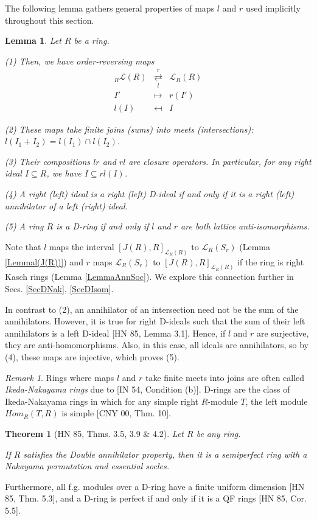 \documentclass[11pt]{article}
\theoremstyle{plain}
\newtheorem{Lemma}[veta]{Lemma}
\newtheorem{Thm}[veta]{Theorem}
\theoremstyle{remark}
\newtheorem*{remark}{Remark}
\theoremstyle{plain}
\begin{document}
The following lemma gathers general properties of maps $l$ and $r$ used implicitly throughout this section.
\begin{Lemma}\label{Lemmalr}
    Let $R$ be a ring. 

 (1)   Then, we have order-reversing maps
\[
\begin{array}{rcl}
_R\mathcal{L}(R) & \overset{r}{\underset{l}{\rightleftarrows}} & \mathcal{L}_R(R) \\
I' & \mapsto & r(I') \\
l(I) & \mapsfrom & I
\end{array}
\]

(2) These maps take finite joins (sums) into meets (intersections): $l(I_1+I_2)=l(I_1)\cap l(I_2)$.

(3) Their compositions $lr$ and $rl$ are closure operators. In particular, for any right ideal $I\subseteq R$, we have $I\subseteq rl(I)$.

(4) A right (left) ideal is a right (left) D-ideal if and only if it is a right (left) annihilator of a left (right) ideal.

(5) A ring $R$ is a D-ring if and only if $l$ and $r$ are both lattice anti-isomorphisms. 
\end{Lemma}
Note that $l$ maps the interval $[J(R), R]_{\mathcal{L}_R(R)}$ to $\mathcal{L}_R(S_r)$ (Lemma \ref{Lemmal(J(R))}) and $r$ maps $\mathcal{L}_R(S_r)$ to $[J(R), R]_{\mathcal{L}_R(R)}$ if the ring is right Kasch rings (Lemma \ref{LemmaAnnSoc}). We explore this connection further in Secs. \ref{SecDNak}, \ref{SecDIsom}.

In contrast to (2), an annihilator of an intersection need not be the sum of the annihilators. However, it is true for right D-ideals such that the sum of their left annihilators is a left D-ideal [HN 85, Lemma 3.1]. Hence, if $l$ and $r$ are surjective, they are anti-homomorphisms. Also, in this case, all ideals are annihilators, so by (4), these maps are injective, which proves (5). 
\begin{remark}
    Rings where maps $l$ and $r$ take finite meets into joins are often called \textit{Ikeda-Nakayama rings} due to [IN 54, Condition (b)]. D-rings are the class of Ikeda-Nakayama rings in which for any simple right $R$-module $T$, the left module $Hom_R(T, R)$ is simple [CNY 00, Thm. 10].  
\end{remark}
\begin{Thm}[HN 85, Thms. 3.5, 3.9 \& 4.2]\label{ThmD}
Let $R$ be any ring.

If $R$ satisfies the Double annihilator property, then it is a semiperfect ring with a Nakayama permutation and essential socles.   
\end{Thm}
Furthermore, all f.g. modules over a D-ring have a finite uniform dimension [HN 85, Thm. 5.3], and a D-ring is perfect if and only if it is a QF rings [HN 85, Cor. 5.5].
\end{document}
